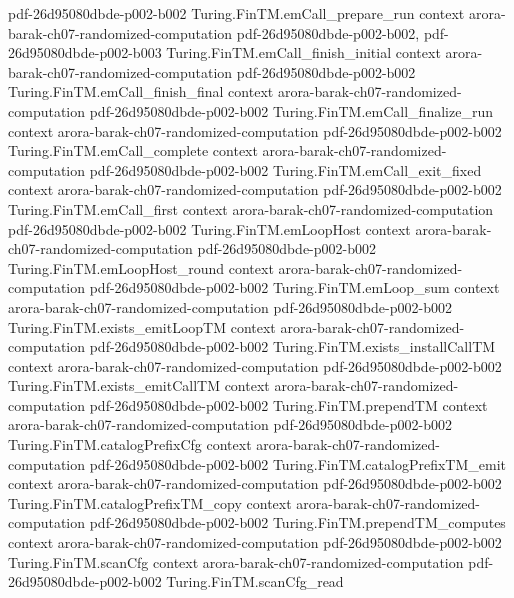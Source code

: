 \begin{theorem}
  {pdf-26d95080dbde-p002-b002}
\proofstep
  {Turing.FinTM.emCall_prepare_run}
  {context}
  {arora-barak-ch07-randomized-computation}
  {pdf-26d95080dbde-p002-b002,
    pdf-26d95080dbde-p002-b003}
\proofstep
  {Turing.FinTM.emCall_finish_initial}
  {context}
  {arora-barak-ch07-randomized-computation}
  {pdf-26d95080dbde-p002-b002}
\proofstep
  {Turing.FinTM.emCall_finish_final}
  {context}
  {arora-barak-ch07-randomized-computation}
  {pdf-26d95080dbde-p002-b002}
\proofstep
  {Turing.FinTM.emCall_finalize_run}
  {context}
  {arora-barak-ch07-randomized-computation}
  {pdf-26d95080dbde-p002-b002}
\proofstep
  {Turing.FinTM.emCall_complete}
  {context}
  {arora-barak-ch07-randomized-computation}
  {pdf-26d95080dbde-p002-b002}
\proofstep
  {Turing.FinTM.emCall_exit_fixed}
  {context}
  {arora-barak-ch07-randomized-computation}
  {pdf-26d95080dbde-p002-b002}
\proofstep
  {Turing.FinTM.emCall_first}
  {context}
  {arora-barak-ch07-randomized-computation}
  {pdf-26d95080dbde-p002-b002}
\proofstep
  {Turing.FinTM.emLoopHost}
  {context}
  {arora-barak-ch07-randomized-computation}
  {pdf-26d95080dbde-p002-b002}
\proofstep
  {Turing.FinTM.emLoopHost_round}
  {context}
  {arora-barak-ch07-randomized-computation}
  {pdf-26d95080dbde-p002-b002}
\proofstep
  {Turing.FinTM.emLoop_sum}
  {context}
  {arora-barak-ch07-randomized-computation}
  {pdf-26d95080dbde-p002-b002}
\proofstep
  {Turing.FinTM.exists_emitLoopTM}
  {context}
  {arora-barak-ch07-randomized-computation}
  {pdf-26d95080dbde-p002-b002}
\proofstep
  {Turing.FinTM.exists_installCallTM}
  {context}
  {arora-barak-ch07-randomized-computation}
  {pdf-26d95080dbde-p002-b002}
\proofstep
  {Turing.FinTM.exists_emitCallTM}
  {context}
  {arora-barak-ch07-randomized-computation}
  {pdf-26d95080dbde-p002-b002}
\proofstep
  {Turing.FinTM.prependTM}
  {context}
  {arora-barak-ch07-randomized-computation}
  {pdf-26d95080dbde-p002-b002}
\proofstep
  {Turing.FinTM.catalogPrefixCfg}
  {context}
  {arora-barak-ch07-randomized-computation}
  {pdf-26d95080dbde-p002-b002}
\proofstep
  {Turing.FinTM.catalogPrefixTM_emit}
  {context}
  {arora-barak-ch07-randomized-computation}
  {pdf-26d95080dbde-p002-b002}
\proofstep
  {Turing.FinTM.catalogPrefixTM_copy}
  {context}
  {arora-barak-ch07-randomized-computation}
  {pdf-26d95080dbde-p002-b002}
\proofstep
  {Turing.FinTM.prependTM_computes}
  {context}
  {arora-barak-ch07-randomized-computation}
  {pdf-26d95080dbde-p002-b002}
\proofstep
  {Turing.FinTM.scanCfg}
  {context}
  {arora-barak-ch07-randomized-computation}
  {pdf-26d95080dbde-p002-b002}
\proofstep
  {Turing.FinTM.scanCfg_read}

\end{theorem}
